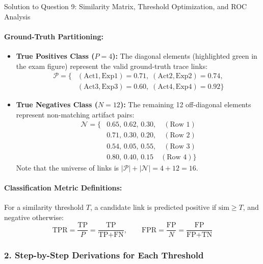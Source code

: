 \documentclass[11pt,a4paper]{article}
\begin{document}
\begin{solutionbox}{Solution to Question 9: Similarity Matrix, Threshold Optimization, and ROC Analysis}
\paragraph{Ground-Truth Partitioning:}
\begin{itemize}[leftmargin=1.5em]
    \item \textbf{True Positives Class ($P = 4$):} The diagonal elements (highlighted green in the exam figure) represent the valid ground-truth trace links:
    \begin{align*}
        \mathcal{P} = \{ &(\text{Act1},\text{Exp1})=0.71, \; (\text{Act2},\text{Exp2})=0.74, \\
                         &(\text{Act3},\text{Exp3})=0.60, \; (\text{Act4},\text{Exp4})=0.92 \}
    \end{align*}
    \item \textbf{True Negatives Class ($N = 12$):} The remaining 12 off-diagonal elements represent non-matching artifact pairs:
    \begin{align*}
        \mathcal{N} = \{ & 0.65, \, 0.62, \, 0.30, \quad (\text{Row 1}) \\
                         & 0.71, \, 0.30, \, 0.20, \quad (\text{Row 2}) \\
                         & 0.54, \, 0.05, \, 0.55, \quad (\text{Row 3}) \\
                         & 0.80, \, 0.40, \, 0.15 \quad (\text{Row 4}) \}
    \end{align*}
    Note that the universe of links is $|\mathcal{P}| + |\mathcal{N}| = 4 + 12 = 16$.
\end{itemize}

\paragraph{Classification Metric Definitions:}
For a similarity threshold $T$, a candidate link is predicted positive if $\text{sim} \ge T$, and negative otherwise:
\begin{equation}
    \text{TPR} = \frac{\text{TP}}{P} = \frac{\text{TP}}{\text{TP} + \text{FN}}, \qquad \text{FPR} = \frac{\text{FP}}{N} = \frac{\text{FP}}{\text{FP} + \text{TN}}
\end{equation}

\subsubsection*{2. Step-by-Step Derivations for Each Threshold}


\end{solutionbox}
\end{document}
